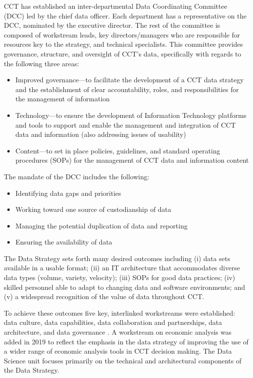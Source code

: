 CCT has established an inter-departmental Data Coordinating Committee (DCC) led by the chief data officer. Each department has a representative on the DCC, nominated by the executive director. The rest of the committee is composed of workstream leads, key directors/managers who are responsible for resources key to the strategy, and technical specialists. This committee provides governance, structure, and oversight of CCT's data, specifically with regards to the following three areas:

\begin{itemize}
\tightlist
\item
  Improved governance---to facilitate the development of a CCT data strategy and the establishment of clear accountability, roles, and responsibilities for the management of information
\item
  Technology---to ensure the development of Information Technology platforms and tools to support and enable the management and integration of CCT data and information (also addressing issues of usability)
\item
  Content---to set in place policies, guidelines, and standard operating procedures (SOPs) for the management of CCT data and information content \citep{cityofcapetown2018}
\end{itemize}

The mandate of the DCC includes the following:

\begin{itemize}
\tightlist
\item
  Identifying data gaps and priorities
\item
  Working toward one source of custodianship of data
\item
  Managing the potential duplication of data and reporting
\item
  Ensuring the availability of data
\end{itemize}

The Data Strategy sets forth many desired outcomes including (i) data sets available in a usable format; (ii) an IT architecture that accommodates diverse data types (volume, variety, velocity); (iii) SOPs for good data practices; (iv) skilled personnel able to adapt to changing data and software environments; and (v) a widespread recognition of the value of data throughout CCT.

To achieve these outcomes five key, interlinked workstreams were established: data culture, data capabilities, data collaboration and partnerships, data architecture, and data governance \citep{cityofcapetown2018}. A workstream on economic analysis was added in 2019 to reflect the emphasis in the data strategy of improving the use of a wider range of economic analysis tools in CCT decision making. The Data Science unit focuses primarily on the technical and architectural components of the Data Strategy.

